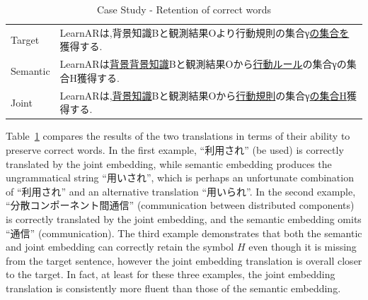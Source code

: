 \begin{table}[h]
    \begin{CJK}{UTF8}{ipxm}
        \begin{tabularx}{\textwidth}{p{1.2cm}b}
            Target & LearnARは,背景知識Bと観測結果Oより行動規則の集合γ\underline{の集合を}獲得する. \\
            Semantic & LearnARは\underline{背景背景知識}Bと観測結果Oから\underline{行動ルール}の集合γの集合H獲得する. \\
            Joint & LearnARは,\underline{背景知識}Bと観測結果Oから\underline{行動規則}の集合γ\underline{の集合H}獲得する. \\\midrule
        \end{tabularx}
    \end{CJK}

    \caption{Case Study - Retention of correct words}
    \label{tab:case_study1}
\end{table}

\begin{CJK}{UTF8}{ipxm}
    Table~\ref{tab:case_study1} compares the results of the two translations in terms of their ability to preserve correct words. In the first example, ``利用され'' (be used) is correctly translated by the joint embedding, while semantic embedding produces the ungrammatical string ``用いされ'', which is perhaps an unfortunate combination of ``利用され'' and an alternative translation ``用いられ''.
In the second example, ``分散コンポーネント間通信'' (communication between distributed components) is correctly translated by the joint embedding, and the semantic embedding omits ``通信'' (communication).  The third example demonstrates that both the semantic and joint embedding can correctly retain the symbol $H$ even though it is missing from the target sentence, however the joint embedding translation is overall closer to the target.  In fact, at least for these three examples, the joint embedding translation is consistently more fluent than those of the semantic embedding. 
\end{CJK}

